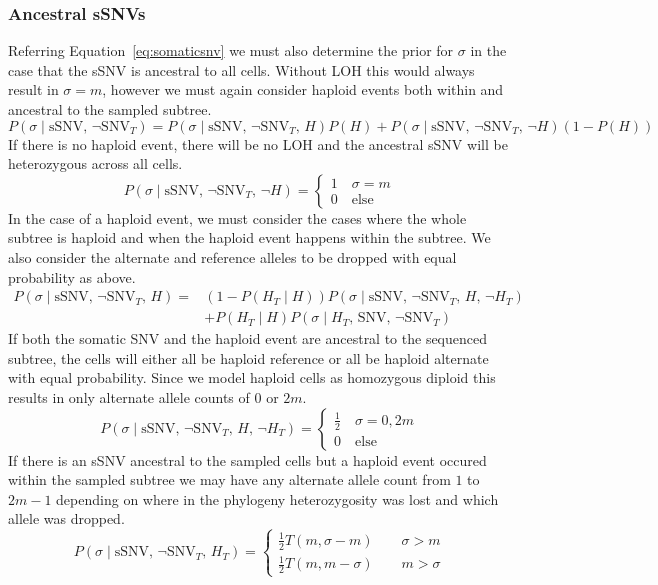 \documentclass[../../main.tex]{subfiles}
\begin{document}
\subsubsection*{Ancestral sSNVs}
Referring Equation~\eqref{eq:somaticsnv} we must also determine the prior for $\sigma$ in the case that the sSNV is ancestral to all cells.
Without LOH this would always result in $\sigma=m$, however we must again consider haploid events both within and ancestral to the sampled subtree.
\begin{equation} \label{eq:ancestralsnv}
P(\sigma\mid\text{sSNV},\,\neg\text{SNV}_T)=P(\sigma\mid\text{sSNV},\,\neg\text{SNV}_T,\,H)P(H)+P(\sigma\mid\text{sSNV},\,\neg\text{SNV}_T,\,\neg H)(1-P(H))
\end{equation}
If there is no haploid event, there will be no LOH and the ancestral sSNV will be heterozygous across all cells.
\begin{equation*}
P(\sigma\mid\text{sSNV},\,\neg\text{SNV}_T,\,\neg H) = \begin{cases}1\quad \sigma=m\\ 0\quad\text{else}\end{cases}
\end{equation*}
In the case of a haploid event, we must consider the cases where the whole subtree is haploid and when the haploid event happens within the subtree.
We also consider the alternate and reference alleles to be dropped with equal probability as above.
\begin{align*}
P(\sigma\mid\text{sSNV},\,\neg\text{SNV}_T,\,H)=&(1-P(H_T\mid H))P(\sigma\mid \text{sSNV},\,\neg\text{SNV}_T,\,H,\,\neg H_T)\\
&+P(H_T\mid H)P(\sigma\mid H_T,\,\text{SNV},\,\neg\text{SNV}_T)
\end{align*}
If both the somatic SNV and the haploid event are ancestral to the sequenced subtree, the cells will either all be haploid reference or all be haploid alternate with equal probability.
Since we model haploid cells as homozygous diploid this results in only alternate allele counts of $0$ or $2m$.
\begin{equation*}
P(\sigma\mid\text{sSNV},\,\neg\text{SNV}_T,\,H,\,\neg H_T)= \begin{cases} \frac{1}{2} \quad \sigma=0,2m\\0\quad \text{else} \end{cases}
\end{equation*}
If there is an sSNV ancestral to the sampled cells but a haploid event occured within the sampled subtree we may have any alternate allele count from $1$ to $2m-1$ depending on where in the phylogeny heterozygosity was lost and which allele was dropped.
\begin{equation*}
P(\sigma\mid\text{sSNV},\,\neg\text{SNV}_T,\,H_T) = \begin{cases} \frac{1}{2}T(m,\sigma-m)\qquad \sigma > m\\
\frac{1}{2}T(m,m-\sigma)\qquad m > \sigma \end{cases}
\end{equation*}
\end{document}
